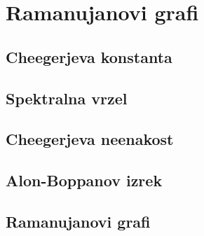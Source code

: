 \section{Ramanujanovi grafi}
\subsection{Cheegerjeva konstanta}
\subsection{Spektralna vrzel}
\subsection{Cheegerjeva neenakost}
\subsection{Alon-Boppanov izrek}
\subsection{Ramanujanovi grafi}